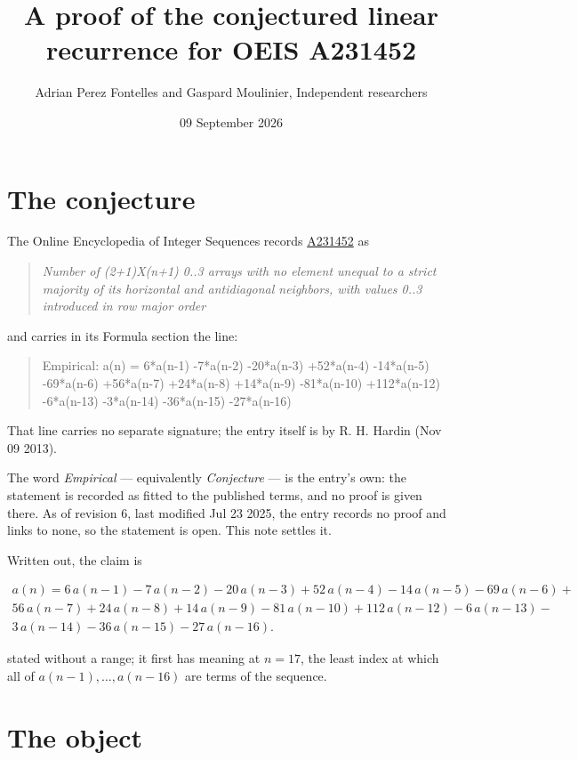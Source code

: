 \documentclass[11pt]{article}
\title{A proof of the conjectured linear recurrence for OEIS A231452}
\author{Adrian Perez Fontelles and Gaspard Moulinier, Independent researchers}
\date{09 September 2026}
\theoremstyle{definition}
\begin{document}
\maketitle
\section{The conjecture}

The Online Encyclopedia of Integer Sequences records \href{https://oeis.org/A231452}{A231452} as

\begin{quote}\itshape Number of (2+1)X(n+1) 0..3 arrays with no element unequal to a strict majority of its horizontal and antidiagonal neighbors, with values 0..3 introduced in row major order\end{quote}

and carries in its Formula section the line:

\begin{quote}\ttfamily Empirical: a(n) = 6*a(n-1) -7*a(n-2) -20*a(n-3) +52*a(n-4) -14*a(n-5) -69*a(n-6) +56*a(n-7) +24*a(n-8) +14*a(n-9) -81*a(n-10) +112*a(n-12) -6*a(n-13) -3*a(n-14) -36*a(n-15) -27*a(n-16)\end{quote}

That line carries no separate signature; the entry itself is by R. H. Hardin (Nov 09 2013).

The word {\itshape Empirical} --- equivalently {\itshape Conjecture} --- is the entry's own: the statement is recorded as fitted to the published terms, and no proof is given there. As of revision 6, last modified Jul 23 2025, the entry records no proof and links to none, so the statement is open. This note settles it.

Written out, the claim is

\begin{multline*} a(n) = 6\,a(n-1) - 7\,a(n-2) - 20\,a(n-3) + 52\,a(n-4) - 14\,a(n-5) - 69\,a(n-6) + \\ 56\,a(n-7) + 24\,a(n-8) + 14\,a(n-9) - 81\,a(n-10) + 112\,a(n-12) - 6\,a(n-13) - \\ 3\,a(n-14) - 36\,a(n-15) - 27\,a(n-16). \end{multline*}

stated without a range; it first has meaning at $n = 17$, the least index at which all of $a(n-1),\dots,a(n-16)$ are terms of the sequence.

\section{The object}
\end{document}

